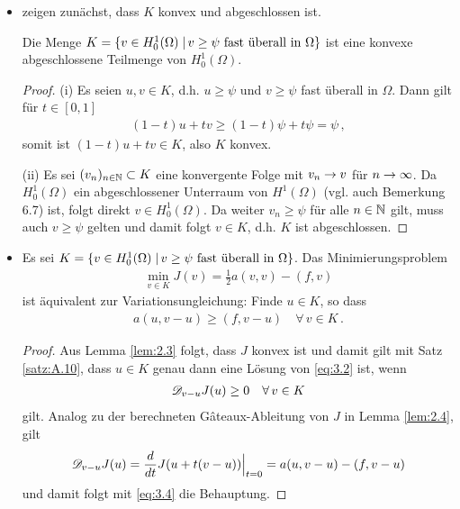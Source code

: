 \begin{itemize}
\item zeigen zunächst, dass $K$ konvex und abgeschlossen ist.
\begin{lemma}\label{lem:3.1}
Die Menge $K =  \{v \in H^1_0(\Omega) \;\vert\, v\ge \psi\text{ fast überall in }\Omega\}$ ist eine konvexe abgeschlossene Teilmenge von $H^1_0(\Omega)$.
\end{lemma}

\begin{proof}
(i) Es seien $u,v \in K$, d.h. $u \ge \psi$ und $v \ge \psi$ fast überall in $\Omega$. Dann gilt für $t \in [0,1]$
\begin{align*}
	(1-t) u + tv \ge (1-t)\psi + t \psi = \psi  \, ,
\end{align*}
somit ist $(1-t)u + tv \in K$, also $K$ konvex.

(ii) Es sei $(v_n)_{n\in \mathbb{N}}\subset K$ eine konvergente Folge mit $v_n \rightarrow v$ für $n\rightarrow \infty$. Da $H^1_0(\Omega)$ ein abgeschlossener Unterraum von $H^1(\Omega)$ (vgl. auch \cite{Walker} Bemerkung 6.7) ist, folgt direkt $v \in H^1_0(\Omega)$. Da weiter $v_n \ge \psi$ für alle $n \in \mathbb{N}$ gilt, muss auch $v \ge \psi$ gelten und damit folgt $v \in K$, d.h. $K$ ist abgeschlossen.
\end{proof}

\item \begin{satz}\label{satz:3.2}
Es sei $K =   \{v \in H^1_0(\Omega) \;\vert\, v\ge \psi\text{ fast überall in }\Omega\}$. Das Minimierungsproblem
\begin{align}\label{eq:3.2}
	\min_{v\in K} J(v) = \frac 1 2 a(v,v)-(f,v)
\end{align}
ist äquivalent zur Variationsungleichung: Finde $u \in K$, so dass
\begin{align}\label{eq:3.3}
	a(u,v-u) \ge (f,v-u) \quad \forall \, v \in K \, .
\end{align}
\end{satz}

\begin{proof}
Aus Lemma \ref{lem:2.3} folgt, dass $J$ konvex ist und damit gilt mit Satz \ref{satz:A.10}, dass $u \in K$ genau dann eine Lösung von \eqref{eq:3.2} ist, wenn
\begin{align}\label{eq:3.4}
	\mathscr D_{v-u} J(u) \ge 0 \quad \forall \, v \in K 
\end{align}
gilt. Analog zu der berechneten Gâteaux-Ableitung von $J$ in Lemma \ref{lem:2.4}, gilt
\[
	\mathscr D_{v-u} J(u) = \frac d{dt} J(u+t(v-u))\Big|_{t=0} = a(u,v-u) -(f,v-u)
\]
und damit folgt mit \eqref{eq:3.4} die Behauptung.
\end{proof}


\end{itemize}
